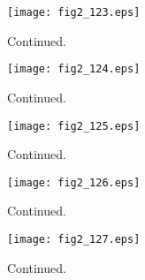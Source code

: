\documentclass[preprint]{aastex}
\begin{document}
\setcounter{figure}{1}
\begin{figure}[t]
\centering
\texttt{[image: fig2\_123.eps]}
\caption{
Continued. 
}
\label{Fig2}
\end{figure}
\clearpage



\setcounter{figure}{1}
\begin{figure}[t]
\centering
\texttt{[image: fig2\_124.eps]}
\caption{
Continued. 
}
\label{Fig2}
\end{figure}
\clearpage



\setcounter{figure}{1}
\begin{figure}[t]
\centering
\texttt{[image: fig2\_125.eps]}
\caption{
Continued. 
}
\label{Fig2}
\end{figure}
\clearpage



\setcounter{figure}{1}
\begin{figure}[t]
\centering
\texttt{[image: fig2\_126.eps]}
\caption{
Continued. 
}
\label{Fig2}
\end{figure}
\clearpage



\setcounter{figure}{1}
\begin{figure}[t]
\centering
\texttt{[image: fig2\_127.eps]}
\caption{
Continued. 
}
\label{Fig2}
\end{figure}
\clearpage
\end{document}
